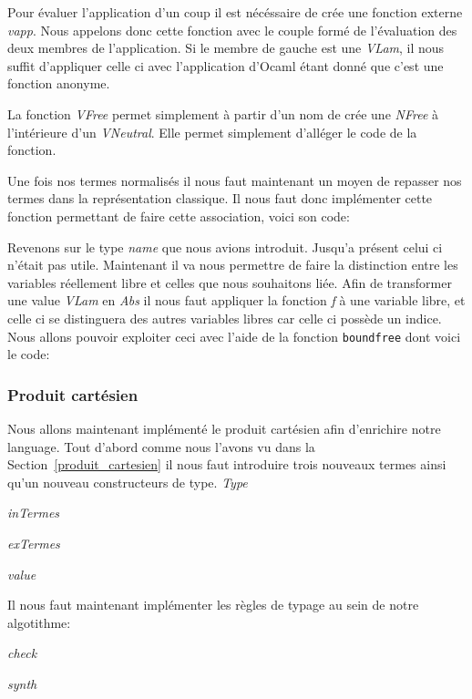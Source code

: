 \documentclass {article}
\newcommand{\codefrom}[3]
           {}
\theoremstyle{definition}
\theoremstyle{remark}
\newcommand{\fun}[1]{\lstinline!#1!}
\begin{document}
Pour évaluer l'application d'un coup il est nécéssaire de crée une fonction externe \emph{vapp}.
Nous appelons donc cette fonction avec le couple formé de l'évaluation des deux membres de l'application.
Si le membre de gauche est une \emph{VLam}, il nous suffit d'appliquer celle ci avec l'application d'Ocaml
étant donné que c'est une fonction anonyme.

La fonction \emph{VFree} permet simplement à partir d'un nom de crée une \emph{NFree}
à l'intérieure d'un \emph{VNeutral}.
Elle permet simplement d'alléger le code de la fonction.

\codefrom{typed}{lambda}{vfree}



Une fois nos termes normalisés il nous faut maintenant un moyen de repasser nos termes
dans la représentation classique. Il nous faut donc implémenter cette fonction permettant de 
faire cette association, voici son code:

\codefrom{typed}{lambda}{value_to_inTm}
\codefrom{typed}{lambda}{neutral_to_exTm}

Revenons sur le type \emph{name} que nous avions introduit. Jusqu'a présent 
celui ci n'était pas utile. Maintenant il va nous permettre de faire la distinction 
entre les variables réellement libre et celles que nous souhaitons liée.
Afin de transformer une value \emph{VLam} en \emph{Abs} il nous faut 
appliquer la fonction \emph{f} à une variable libre, et celle ci se distinguera des
autres variables libres car celle ci possède un indice. 
Nous allons pouvoir exploiter ceci avec l'aide de la fonction \fun{boundfree} dont 
voici le code:
\codefrom{typed}{lambda}{boundfree}

\subsubsection{Produit cartésien}

Nous allons maintenant implémenté le produit cartésien afin d'enrichire notre 
language. Tout d'abord comme nous l'avons vu dans la Section~\ref{produit_cartesien}
il nous faut introduire trois nouveaux termes ainsi qu'un nouveau constructeurs de type.
\emph{Type}
\codefrom{typed}{lambda}{type_pair}
\emph{inTermes}
\codefrom{typed}{lambda}{inTm_pair}
\emph{exTermes}
\codefrom{typed}{lambda}{exTm_pair}
\emph{value}
\codefrom{typed}{lambda}{value_pair}

Il nous faut maintenant implémenter les règles de typage au sein de notre algotithme:

\emph{check}
\codefrom{typed}{lambda}{check_pair}
\emph{synth}
\codefrom{typed}{lambda}{synth_pair}
\end{document}
